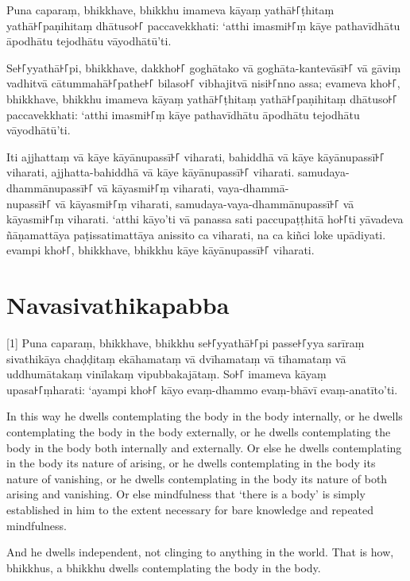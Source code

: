Puna caparaṃ, bhikkhave, bhikkhu imameva kāyaṃ yathā꜔꜒ṭhitaṃ yathā꜔꜒paṇihitaṃ
dhātuso꜔꜒ paccavekkhati: ‘atthi imasmi꜔꜒ṃ kāye pathavīdhātu āpodhātu tejodhātu
vāyodhātū’ti.

Se꜔꜒yyathā꜔꜒pi, bhikkhave, dakkho꜔꜒ goghātako vā goghāta-kantevāsī꜔꜒ vā gāviṃ vadhitvā
cātummahā꜔꜒pathe꜔꜒ bilaso꜔꜒ vibhajitvā nisi꜔꜒nno assa; evameva kho꜔꜒, bhikkhave, bhikkhu
imameva kāyaṃ yathā꜔꜒ṭhitaṃ yathā꜔꜒paṇihitaṃ dhātuso꜔꜒ paccavekkhati: ‘atthi imasmi꜔꜒ṃ
kāye pathavīdhātu āpodhātu tejodhātu vāyodhātū’ti.

Iti ajjhattaṃ vā kāye kāyānupassī꜔꜒ viharati, bahiddhā vā kāye kāyānupassī꜔꜒
viharati, ajjhatta-bahiddhā vā kāye kāyānupassī꜔꜒ viharati. samudaya-dhammānupassī꜔꜒
vā kāyasmi꜔꜒ṃ viharati, vaya-dhammā-\\
nupassī꜔꜒ vā kāyasmi꜔꜒ṃ viharati, samudaya-vaya-dhammānupassī꜔꜒ vā kāyasmi꜔꜒ṃ viharati.
‘atthi kāyo’ti vā panassa sati paccupaṭṭhitā ho꜔꜒ti yāvadeva ñāṇamattāya
paṭissatimattāya anissito ca viharati, na ca kiñci loke upādiyati. evampi kho꜔꜒,
bhikkhave, bhikkhu kāye kāyānupassī꜔꜒ viharati.


\section*{Navasivathikapabba}

[1] Puna caparaṃ, bhikkhave, bhikkhu se꜔꜒yyathā꜔꜒pi passe꜔꜒yya sarīraṃ sivathikāya
chaḍḍitaṃ ekāhamataṃ vā dvīhamataṃ vā tīhamataṃ vā uddhumātakaṃ vinīlakaṃ
vipubbakajātaṃ. So꜔꜒ imameva kāyaṃ upasa꜔꜒ṃharati: ‘ayampi kho꜔꜒ kāyo evaṃ-dhammo
evaṃ-bhāvī evaṃ-anatīto’ti.

\englishPage

In this way he dwells contemplating the body in the body internally, or he
dwells contemplating the body in the body externally, or he dwells contemplating
the body in the body both internally and externally. Or else he dwells
contemplating in the body its nature of arising, or he dwells contemplating in
the body its nature of vanishing, or he dwells contemplating in the body its
nature of both arising and vanishing. Or else mindfulness that ‘there is a body’
is simply established in him to the extent necessary for bare knowledge and
repeated mindfulness.

And he dwells independent, not clinging to anything in the world. That is how,
bhikkhus, a bhikkhu dwells contemplating the body in the body.

